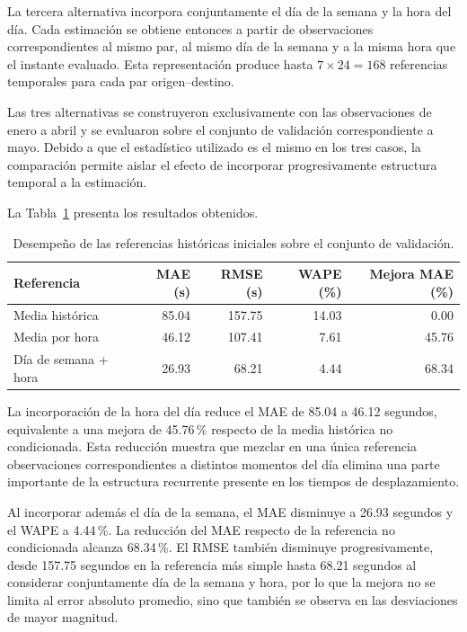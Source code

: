 \documentclass[11pt]{article}
\begin{document}
La tercera alternativa incorpora conjuntamente el día de la semana y la hora del día. Cada estimación se obtiene entonces a partir de observaciones correspondientes al mismo par, al mismo día de la semana y a la misma hora que el instante evaluado. Esta representación produce hasta $7\times24=168$ referencias temporales para cada par origen--destino.

Las tres alternativas se construyeron exclusivamente con las observaciones de enero a abril y se evaluaron sobre el conjunto de validación correspondiente a mayo. Debido a que el estadístico utilizado es el mismo en los tres casos, la comparación permite aislar el efecto de incorporar progresivamente estructura temporal a la estimación.

La Tabla~\ref{tab:relevancia_temporal} presenta los resultados obtenidos.

\begin{table}[htbp]
\centering
\small
\caption{Desempeño de las referencias históricas iniciales sobre el conjunto de validación.}
\label{tab:relevancia_temporal}
\begin{tabular}{lrrrr}
\hline
\textbf{Referencia} &
\textbf{MAE (s)} &
\textbf{RMSE (s)} &
\textbf{WAPE (\%)} &
\textbf{Mejora MAE (\%)} \\
\hline
Media histórica              & 85.04 & 157.75 & 14.03 & 0.00 \\
Media por hora               & 46.12 & 107.41 & 7.61  & 45.76 \\
Día de semana + hora         & 26.93 & 68.21  & 4.44  & 68.34 \\
\hline
\end{tabular}
\end{table}

La incorporación de la hora del día reduce el MAE de 85.04 a 46.12 segundos, equivalente a una mejora de 45.76\,\% respecto de la media histórica no condicionada. Esta reducción muestra que mezclar en una única referencia observaciones correspondientes a distintos momentos del día elimina una parte importante de la estructura recurrente presente en los tiempos de desplazamiento.

Al incorporar además el día de la semana, el MAE disminuye a 26.93 segundos y el WAPE a 4.44\,\%. La reducción del MAE respecto de la referencia no condicionada alcanza 68.34\,\%. El RMSE también disminuye progresivamente, desde 157.75 segundos en la referencia más simple hasta 68.21 segundos al considerar conjuntamente día de la semana y hora, por lo que la mejora no se limita al error absoluto promedio, sino que también se observa en las desviaciones de mayor magnitud.
\end{document}
